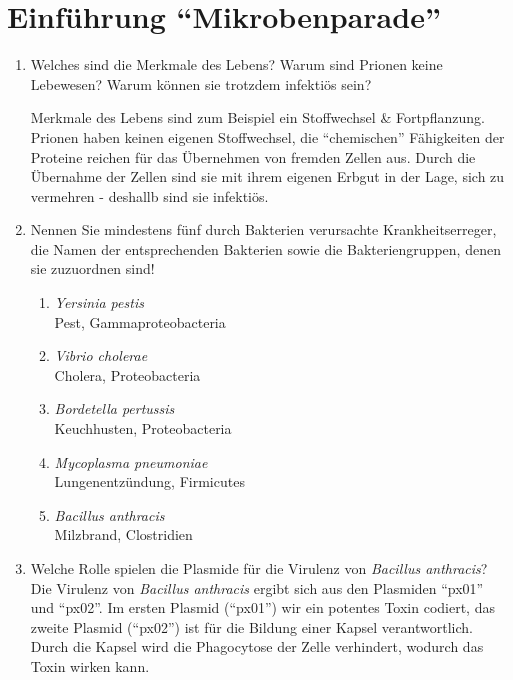 
\section{Einführung ``Mikrobenparade''}
	\begin{enumerate}
		\item Welches sind die Merkmale des Lebens? Warum sind Prionen keine Lebewesen? Warum können sie trotzdem infektiös sein? \hfill \vspace{4mm}

		Merkmale des Lebens sind zum Beispiel ein Stoffwechsel \& Fortpflanzung.
		Prionen haben keinen eigenen Stoffwechsel,
		die ``chemischen'' Fähigkeiten der Proteine reichen für das Übernehmen von fremden Zellen aus.
		Durch die Übernahme der Zellen sind sie mit ihrem eigenen Erbgut in der Lage,
		sich zu vermehren - deshallb sind sie infektiös.


	\item Nennen Sie mindestens fünf durch Bakterien verursachte Krankheitserreger, die Namen der entsprechenden Bakterien sowie die Bakteriengruppen, denen sie zuzuordnen sind!

		\begin{enumerate}[label=\arabic*)]
			\item \emph{Yersinia pestis} \hfill \\
				Pest, Gammaproteobacteria
			\item \emph{Vibrio cholerae} \hfill \\
				Cholera, Proteobacteria
			\item \emph{Bordetella pertussis} \hfill \\
				Keuchhusten, Proteobacteria
			\item \emph{Mycoplasma pneumoniae} \hfill \\
				Lungenentzündung, Firmicutes
			\item \emph{Bacillus anthracis} \hfill \\
				Milzbrand, Clostridien
		\end{enumerate}


	\item Welche Rolle spielen die Plasmide für die Virulenz von \emph{Bacillus anthracis}?  \hfill \vspace{0.2mm} \\
	
			Die Virulenz von \emph{Bacillus anthracis} ergibt sich
			aus den Plasmiden ``px01'' und ``px02''.
			Im ersten Plasmid (``px01'') wir ein potentes Toxin codiert,
			das zweite Plasmid (``px02'') ist für die Bildung einer Kapsel verantwortlich.
			Durch die Kapsel wird die Phagocytose der Zelle verhindert,
			wodurch das Toxin wirken kann.



\end{enumerate}
